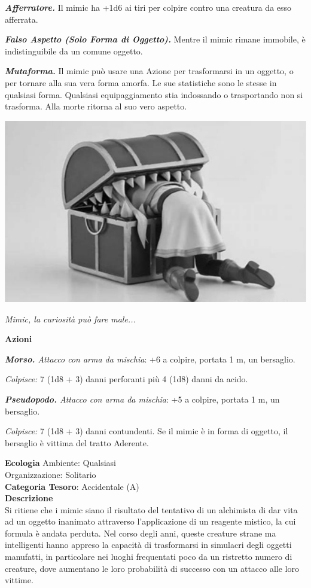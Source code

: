 \begin{multicols}{2}
{\emph{\textbf{Afferratore.}} Il mimic ha +1d6 ai tiri per colpire contro una creatura da esso afferrata.

\emph{\textbf{Falso Aspetto (Solo Forma di Oggetto).}} Mentre il mimic rimane immobile, è indistinguibile da un comune oggetto.

\emph{\textbf{Mutaforma.}} Il mimic può usare una Azione per trasformarsi in un oggetto, o per tornare alla sua vera forma amorfa. Le sue statistiche sono le stesse in qualsiasi forma. Qualsiasi equipaggiamento stia indossando o trasportando non si trasforma. Alla morte ritorna al suo vero aspetto.

\medskip

\begin{center}
	\includegraphics[width=0.9\linewidth]{immagini/mimic_grayscale.png}

	\emph{Mimic, la curiosità può fare male...}
\end{center}

\medskip

\textbf{Azioni}

\emph{\textbf{Morso.} Attacco con arma da mischia}: +6 a colpire, portata 1 m, un bersaglio.

\emph{Colpisce:} 7 (1d8 + 3) danni perforanti più 4 (1d8) danni da acido.

\emph{\textbf{Pseudopodo.} Attacco con arma da mischia}: +5 a colpire, portata 1 m, un bersaglio.

\emph{Colpisce:} 7 (1d8 + 3) danni contundenti. Se il mimic è in forma di oggetto, il bersaglio è vittima del tratto Aderente.

\textbf{Ecologia}
Ambiente: Qualsiasi\\
Organizzazione: Solitario\\
\textbf{Categoria Tesoro}: Accidentale (A)\\
\textbf{Descrizione}\\
Si ritiene che i mimic siano il risultato del tentativo di un alchimista di dar vita ad un oggetto inanimato attraverso l'applicazione di un reagente mistico, la cui formula è andata perduta. Nel corso degli anni, queste creature strane ma intelligenti hanno appreso la capacità di trasformarsi in simulacri degli oggetti manufatti, in particolare nei luoghi frequentati poco da un ristretto numero di creature, dove aumentano le loro probabilità di successo con un attacco alle loro vittime.

}
\end{multicols}
